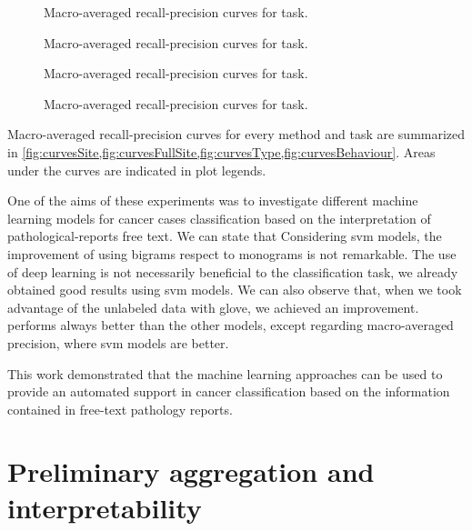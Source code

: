 \begin{figure}
  \centering
  \resizebox{0.9\textwidth}{!}{}
  \caption{Macro-averaged recall-precision curves for \site{} task.}
  \label{fig:curvesSite}
\end{figure}

\begin{figure}
  \centering
  \resizebox{0.9\textwidth}{!}{}
  \caption{Macro-averaged recall-precision curves for \fullSite{} task.}
  \label{fig:curvesFullSite}
\end{figure}

\begin{figure}
  \centering
  \resizebox{0.9\textwidth}{!}{}
  \caption{Macro-averaged recall-precision curves for \type{} task.}
  \label{fig:curvesType}
\end{figure}

\begin{figure}
  \centering
  \resizebox{0.9\textwidth}{!}{}
  \caption{Macro-averaged recall-precision curves for \behaviour{} task.}
  \label{fig:curvesBehaviour}
\end{figure}

Macro-averaged recall-precision curves for every method and task are
summarized in
\cref{fig:curvesSite,fig:curvesFullSite,fig:curvesType,fig:curvesBehaviour}. Areas
under the curves are indicated in 
plot legends.

One of the aims of these experiments was to investigate different
machine learning 
models for cancer cases classification based on the interpretation
of pathological-reports free text. We can state that
Considering \ac{svm} models, the improvement of using
bigrams respect to monograms is not remarkable.
The use of deep learning is not necessarily beneficial to the
classification task, we already obtained good results using \ac{svm}
models. We can also observe that, when we took 
advantage of the unlabeled data with \ac{glove}, we achieved an
improvement.
\lstmb{} performs always better than the other models, except
regarding macro-averaged precision, where \ac{svm} models are better.

This work demonstrated that the machine learning approaches can be
used to provide an automated support in cancer classification based on
the information contained in free-text pathology reports.

\section{Preliminary aggregation and interpretability}
\label{ch:artificial}

